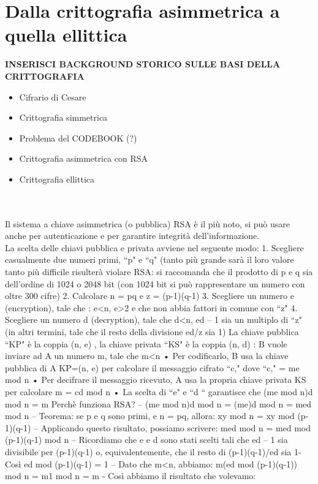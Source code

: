 \documentclass[a4paper,12pt]{tesiinfo}
\begin{document}
\chapter{Dalla crittografia asimmetrica a quella ellittica}
\textbf{INSERISCI BACKGROUND STORICO SULLE BASI DELLA CRITTOGRAFIA }
\begin{itemize}
  \item Cifrario di Cesare
  \item Crittografia simmetrica
  \item Problema del CODEBOOK (?)
  \item Crittografia asimmetrica con RSA
  \item Crittografia ellittica
\end{itemize}
\noindent\makebox[\linewidth]{\rule{\paperwidth}{0.4pt}}
\\
\\
Il sistema a chiave asimmetrica (o pubblica) RSA \`e il pi\`u noto, si pu\`o usare anche per autenticazione e per garantire integrit\`a dell'informazione.
\\
La scelta delle chiavi pubblica e privata avviene nel seguente modo:
1. Scegliere casualmente due numeri primi, ``p" e ``q"
(tanto pi\`u grande sar\`a il loro valore tanto pi\`u difficile
risulter\`a violare RSA: si raccomanda che il prodotto di p
e q sia dell'ordine di 1024 o 2048 bit (con 1024 bit si
pu\`o rappresentare un numero con oltre 300 cifre)
2. Calcolare n = pq e z = (p-1)(q-1)
3. Scegliere un numero e (encryption), tale che : e<n, e>2 e che non abbia fattori in comune con ``z"
4. Scegliere un numero d (decryption), tale che d<n, ed – 1 sia un multiplo di ``z" (in altri termini, tale che il resto della divisione ed/z sia 1)
La chiave pubblica ``KP" \`e la coppia (n, e) , la chiave privata ``KS" \`e la coppia (n, d) : B vuole inviare ad A un numero m, tale che m<n
• Per codificarlo, B usa la chiave pubblica di A KP=(n, e) per calcolare il messaggio cifrato ``c," dove ``c," = me mod n
• Per decifrare il messaggio ricevuto, A usa la propria chiave privata KS per calcolare m = cd mod n
• La scelta di ``e" e ``d `` garantisce che (me mod n)d mod n = m 
Perch\`e funziona RSA? – (me mod n)d mod n = (me)d mod n = med mod n
– Teorema: se p e q sono primi, e n = pq, allora: xy mod n = xy mod (p-1)(q-1)
– Applicando questo risultato, possiamo scrivere: med mod n = med mod (p-1)(q-1) mod n
– Ricordiamo che e e d sono stati scelti tali che ed – 1 sia divisibile per (p-1)(q-1) o, equivalentemente, che il resto di (p-1)(q-1)/ed sia 1- Cos\`i ed mod (p-1)(q-1) = 1
– Dato che m<n, abbiamo: m(ed mod (p-1)(q-1)) mod n = m1 mod n = m - Cos\`i abbiamo il risultato che volevamo:
\end{document}
